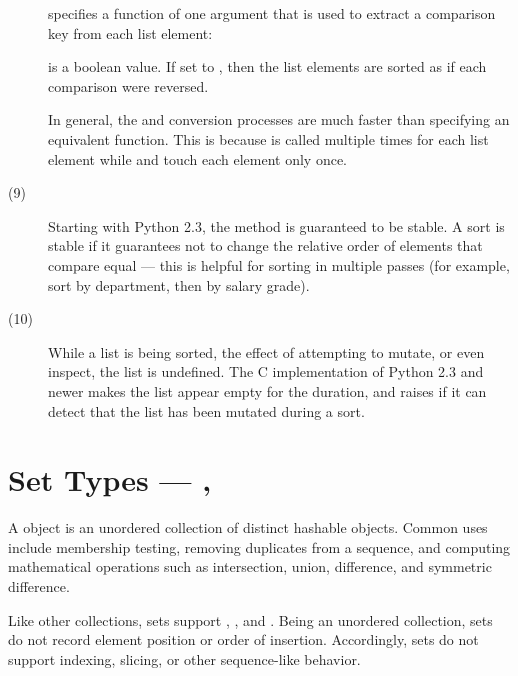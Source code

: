 \begin{description}
   specifies a function of one argument that is used to
     extract a comparison key from each list element:

   is a boolean value.  If set to , then the
     list elements are sorted as if each comparison were reversed.

  In general, the  and  conversion processes are
  much faster than specifying an equivalent  function.  This is
  because  is called multiple times for each list element while
   and  touch each element only once.



\item[(9)] Starting with Python 2.3, the  method is
  guaranteed to be stable.  A sort is stable if it guarantees not to
  change the relative order of elements that compare equal --- this is
  helpful for sorting in multiple passes (for example, sort by
  department, then by salary grade).

\item[(10)] While a list is being sorted, the effect of attempting to
  mutate, or even inspect, the list is undefined.  The C
  implementation of Python 2.3 and newer makes the list appear empty
  for the duration, and raises  if it can detect
  that the list has been mutated during a sort.
\end{description}

\section{Set Types ---
	    , 
	    \label{types-set}}

A  object is an unordered collection of distinct hashable objects.
Common uses include membership testing, removing duplicates from a sequence,
and computing mathematical operations such as intersection, union, difference,
and symmetric difference.

Like other collections, sets support ,
, and .  Being an
unordered collection, sets do not record element position or order of
insertion.  Accordingly, sets do not support indexing, slicing, or
other sequence-like behavior.     

